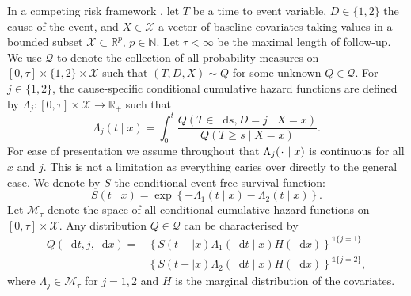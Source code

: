 \documentclass[numsec,webpdf,contemporary,medium,namedate]{oup-authoring-template}%
\theoremstyle{thmstyleone}%
\theoremstyle{thmstyletwo}%
\theoremstyle{thmstylethree}%
\newcommand{\R}{\mathbb{R}}
\newcommand{\N}{\mathbb{N}}
\newcommand{\blank}{\makebox[1ex]{\textbf{$\cdot$}}}
\newcommand*\diff{\mathop{}\!\mathrm{d}}
\newcommand{\1}{\mathds{1}}
\begin{document}
In a competing risk framework \citep{andersen2012statistical}, let \( T\) be a
time to event variable, \(D\in\{1,2\}\) the cause of the event, and
$X \in \mathcal{X}$ a vector of baseline covariates taking values in a bounded
subset \( \mathcal{X} \subset \R^p \), \( p\in\N \). Let $\tau< \infty$ be the
maximal length of follow-up. We use \( \mathcal{Q} \) to denote the collection
of all probability measures on \( [0,\tau] \times \{1,2\}\times \mathcal{X} \)
such that \( (T, D, X) \sim Q \) for some unknown \( Q \in \mathcal{Q} \). For
\(j\in\{1,2\}\), the cause-specific conditional cumulative hazard functions are
defined by
\( \Lambda_{j} \colon [0, \tau] \times \mathcal{X} \rightarrow \R_+ \) such that
\begin{equation*}
  \Lambda_{j}(t \mid x) = \int_0^t\frac{  Q(T \in \diff s, D=j \mid X=x )}{Q(T \geq s \mid X=x )}.
\end{equation*}
For ease of presentation we assume throughout that
\( \Lambda_j(\blank \mid x) \) is continuous for all \( x \) and
\( j \). This is not a limitation as everything caries over directly
to the general case. We denote by \(S\) the conditional event-free
survival function:
\begin{equation}
  \label{eq:surv-def}
  S(t \mid x)=\exp\left\{-\Lambda_{1}(t \mid x)-\Lambda_{2}(t \mid x)\right\}.
\end{equation}
Let \( \mathcal{M}_{\tau}\) denote the space of all conditional cumulative hazard
functions on \( [0,\tau] \times\mathcal{X}\). Any distribution
\( Q \in \mathcal{Q} \) can be characterised by
\begin{equation*}
  \label{eq:parametrizeQ}
  \begin{split}
    Q(\diff t,j,\diff x)=& \left\{S(t- \mid x)\Lambda_1(\diff t \mid x)H(\diff x)\right\}^{\1{\{j=1\}}}\\
                         &  \left\{S(t- \mid x)\Lambda_2(\diff t \mid x)H(\diff x)\right\}^{\1{\{j=2\}}},
  \end{split}
\end{equation*}
where \(\Lambda_{j} \in \mathcal{M}_{\tau}\) for \(j=1,2\) and \(H\) is the marginal
distribution of the covariates.
\end{document}
